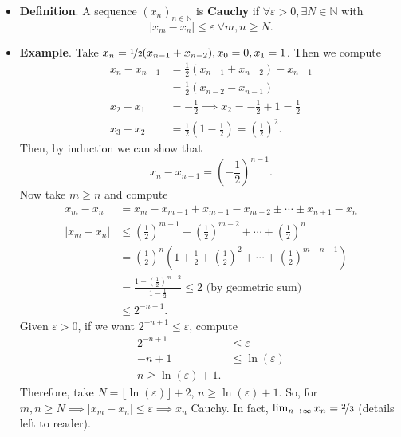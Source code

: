 \documentclass{article}
\newcommand{\N}{\mathbb{N}}
\newcommand{\seq}[2]{(#1_{#2})_{#2 \in \N}}
\newcommand{\?}{\stackrel{?}{=}}
\begin{document}
\begin{itemize}
    \item \textbf{Definition}. A sequence $\seq{x}{n}$ is \textbf{Cauchy} if $\forall \varepsilon > 0, \exists N \in \N$ with
    $$|x_m - x_n| \leq \varepsilon \ \forall m, n \geq N.$$
    \item \textbf{Example}. Take $x_n = \nicefrac{1}{2}(x_{n - 1} + x_{n - 2}), x_0 = 0, x_1 = 1$. Then we compute
    \begin{align*}
        x_n - x_{n - 1} &= \frac{1}{2}(x_{n - 1} + x_{n - 2}) - x_{n - 1} \\
        &= \frac{1}{2}(x_{n - 2} - x_{n - 1}) \\
        x_2 - x_1 &= -\frac{1}{2} \implies x_2 = -\frac{1}{2} + 1 = \frac{1}{2} \\
        x_3 - x_2 &= \frac{1}{2}(1 - \frac{1}{2}) = \left(\frac{1}{2}\right)^2.
    \end{align*}
    Then, by induction we can show that
    $$x_n - x_{n - 1} = \left(-\frac{1}{2}\right)^{n - 1}.$$
    Now take $m \geq n$ and compute
    \begin{align*}
        x_m - x_n &= x_m - x_{m - 1} + x_{m - 1} - x_{m - 2} \pm \cdots \pm x_{n + 1} - x_n \\
        |x_m - x_n| &\leq \left(\frac{1}{2}\right)^{m - 1} + \left(\frac{1}{2}\right)^{m - 2} + \cdots + \left(\frac{1}{2}\right)^n \\
        &= \left(\frac{1}{2}\right)^n\left(1 + \frac{1}{2} + \left(\frac{1}{2}\right)^2 + \cdots + \left(\frac{1}{2}\right)^{m - n - 1}\right) \\
        &= \frac{1 - \left(\frac{1}{2}\right)^{m - 2}}{1 - \frac{1}{2}} \leq 2 \text{ (by geometric sum)} \\
        &\leq 2^{-n + 1}.
    \end{align*}
    Given $\varepsilon > 0$, if we want $2^{-n + 1} \leq \varepsilon$, compute
    \begin{align*}
        2^{-n + 1} &\leq \varepsilon \\
        -n + 1 &\leq \ln(\varepsilon) \\
        n \geq \ln(\varepsilon) + 1.
    \end{align*}
    Therefore, take $N = \lfloor \ln(\varepsilon) \rfloor + 2$, $n \geq \ln(\varepsilon) + 1$. So, for $m, n \geq N \implies |x_m - x_n| \leq \varepsilon \implies x_n$ Cauchy. In fact, $\lim_{n \to \infty} x_n = \nicefrac{2}{3}$ (details left to reader). \\\\

\end{itemize}
\end{document}

